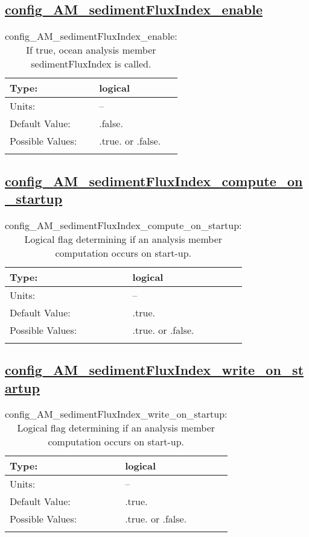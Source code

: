 \subsection[config\_AM\_sedimentFluxIndex\_enable]{\hyperref[sec:nm_tab_AM_sedimentFluxIndex]{config\_AM\_sedimentFluxIndex\_enable}}
\label{subsec:nm_sec_config_AM_sedimentFluxIndex_enable}
\begin{center}
\begin{longtable}{| p{2.0in} || p{4.0in} |}
    \hline
    Type: & logical \\
    \hline
    Units: & -- \\
    \hline
    Default Value: & .false. \\
    \hline
    Possible Values: & .true. or .false. \\
    \hline
    \caption{config\_AM\_sedimentFluxIndex\_enable: If true, ocean analysis member sedimentFluxIndex is called.}
\end{longtable}
\end{center}
\subsection[config\_AM\_sedimentFluxIndex\_compute\_on\_startup]{\hyperref[sec:nm_tab_AM_sedimentFluxIndex]{config\_AM\_sedimentFluxIndex\_compute\_on\_startup}}
\label{subsec:nm_sec_config_AM_sedimentFluxIndex_compute_on_startup}
\begin{center}
\begin{longtable}{| p{2.0in} || p{4.0in} |}
    \hline
    Type: & logical \\
    \hline
    Units: & -- \\
    \hline
    Default Value: & .true. \\
    \hline
    Possible Values: & .true. or .false. \\
    \hline
    \caption{config\_AM\_sedimentFluxIndex\_compute\_on\_startup: Logical flag determining if an analysis member computation occurs on start-up.}
\end{longtable}
\end{center}
\subsection[config\_AM\_sedimentFluxIndex\_write\_on\_startup]{\hyperref[sec:nm_tab_AM_sedimentFluxIndex]{config\_AM\_sedimentFluxIndex\_write\_on\_startup}}
\label{subsec:nm_sec_config_AM_sedimentFluxIndex_write_on_startup}
\begin{center}
\begin{longtable}{| p{2.0in} || p{4.0in} |}
    \hline
    Type: & logical \\
    \hline
    Units: & -- \\
    \hline
    Default Value: & .true. \\
    \hline
    Possible Values: & .true. or .false. \\
    \hline
    \caption{config\_AM\_sedimentFluxIndex\_write\_on\_startup: Logical flag determining if an analysis member computation occurs on start-up.}
\end{longtable}
\end{center}
